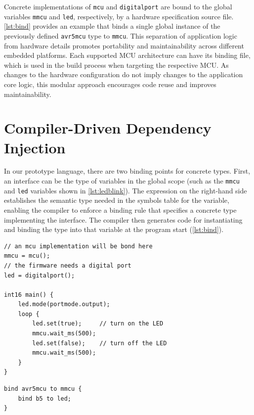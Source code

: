 \documentclass[10pt,sigplan,screen,anonymous]{acmart}
\begin{document}
Concrete implementations of {\tt mcu} and {\tt digitalport} are bound to the global variables {\tt mmcu} and {\tt led}, respectively, by a hardware specification source file. \autoref{lst:bind} provides an example that binds a single global instance of the previously defined {\tt avr5mcu} type to {\tt mmcu}. This separation of application logic from hardware details promotes portability and maintainability across different embedded platforms. Each supported MCU architecture can have its binding file, which is used in the build process when targeting the respective MCU. As changes to the hardware configuration do not imply changes to the application core logic, this modular approach encourages code reuse and improves maintainability.



\section{Compiler-Driven Dependency Injection} \label{sec:design}

In our prototype language, there are two binding points for concrete types. First, an interface can be the type of variables in the global scope (such as the {\tt mmcu} and {\tt led} variables shown in \autoref{lst:ledblink}). The expression on the right-hand side establishes the semantic type needed in the symbols table for the variable, enabling the compiler to enforce a binding rule that specifies a concrete type implementing the interface. The compiler then generates code for instantiating and binding the type into that variable at the program start (\autoref{lst:bind}).


\begin{lstlisting}[float=tp, caption=A hardware-agnostic LED blink example., label={lst:ledblink}]
// an mcu implementation will be bond here
mmcu = mcu();
// the firmware needs a digital port
led = digitalport();

int16 main() {
	led.mode(portmode.output);
	loop {
		led.set(true);     // turn on the LED
		mmcu.wait_ms(500);
		led.set(false);    // turn off the LED
		mmcu.wait_ms(500);
	}
}
\end{lstlisting}



\begin{lstlisting}[float=tp, caption=DI code for binding an AVR MCU in the LED blink example., label=lst:bind]
bind avr5mcu to mmcu {
	bind b5 to led;
}
\end{lstlisting}
\end{document}
